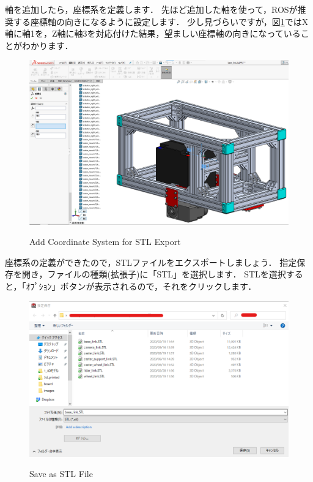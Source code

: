 \documentclass[{../../master}]{subfiles}
\begin{document}
\noindent
軸を追加したら，座標系を定義します．
先ほど追加した軸を使って，ROSが推奨する座標軸の向きになるように設定します．
少し見づらいですが，図\ref{fig:base_link_create_coordinate_system}ではX軸に軸1を，Z軸に軸3を対応付けた結果，望ましい座標軸の向きになっていることがわかります．

\begin{figure}[ht]
  \centering
  \includegraphics[width=100truemm, clip]{images/base_link_create_coordinate_system.png}
  \label{fig:base_link_create_coordinate_system}
  \caption{Add Coordinate System for STL Export}
\end{figure}

座標系の定義ができたので，STLファイルをエクスポートしましょう．
指定保存を開き，ファイルの種類(拡張子)に「STL」を選択します．
STLを選択すると，「ｵﾌﾟｼｮﾝ」ボタンが表示されるので，それをクリックします．

\begin{figure}[ht]
  \centering
  \includegraphics[width=100truemm, clip]{images/base_link_save_as_stl.png}
  \label{fig:base_link_save_as_stl}
  \caption{Save as STL File}
\end{figure}
\end{document}
